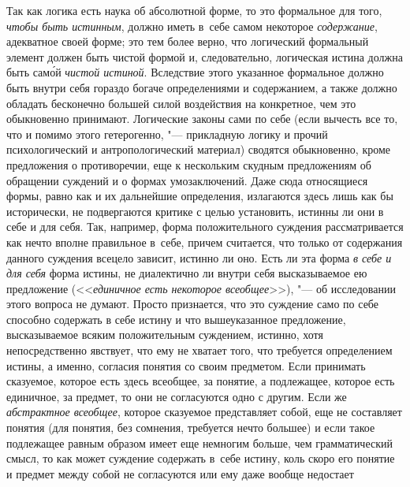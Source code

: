 Так как логика есть наука об абсолютной форме, то это
формальное для того, {\em чтобы быть
истинным}, должно иметь в~себе самом некоторое {\em содержание},
адекватное своей форме; это тем более верно, что логический
формальный элемент должен быть чистой формой и, следовательно, логическая
истина должна быть сам\'{о}й {\em чистой
истиной}. Вследствие этого указанное формальное должно быть
внутри себя гораздо богаче определениями и содержанием, а также должно
обладать бесконечно большей силой воздействия на конкретное, чем это
обыкновенно принимают.
Логические законы сами по себе (если вычесть все то, что и
помимо этого гетерогенно, "--- прикладную логику и прочий
психологический и антропологический материал) сводятся обыкновенно, кроме
предложения о противоречии, еще к нескольким скудным предложениям об
обращении суждений и о формах умозаключений. Даже сюда относящиеся формы,
равно как и их дальнейшие определения, излагаются здесь лишь как бы
исторически, не подвергаются критике с целью установить, истинны ли они в
себе и для себя. Так, например, форма положительного суждения
рассматривается как нечто вполне правильное в~себе, причем
считается, что только от содержания данного суждения всецело зависит,
истинно ли оно. Есть ли эта форма {\em в
себе и для себя} форма истины, не диалектично ли внутри себя
высказываемое ею предложение (<<{\em единичное есть некоторое
всеобщее}>>), "--- об исследовании этого вопроса не думают. Просто
признается, что это суждение само по себе способно содержать в
себе истину и что вышеуказанное предложение, высказываемое всяким
положительным суждением, истинно, хотя непосредственно явствует, что ему не
хватает того, что требуется определением истины, а именно, согласия понятия
со своим предметом. Если принимать сказуемое, которое есть здесь всеобщее,
за понятие, а подлежащее, которое есть единичное, за предмет, то они не
согласуются одно с другим. Если же {\em абстрактное всеобщее},
которое сказуемое представляет собой, еще не составляет
понятия (для понятия, без сомнения, требуется нечто большее) и если такое
подлежащее равным образом имеет еще немногим больше, чем грамматический
смысл, то как может суждение содержать в~себе истину, коль скоро его
понятие и предмет между собой не согласуются или ему даже вообще недостает
